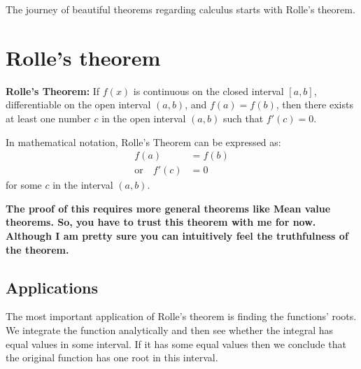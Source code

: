 The journey of beautiful theorems regarding calculus starts with Rolle's theorem. 

\section{Rolle's theorem}

\textbf{Rolle's Theorem:} If $f(x)$ is continuous on the closed interval $[a, b]$, differentiable on the open interval $(a, b)$, and $f(a) = f(b)$, then there exists at least one number $c$ in the open interval $(a, b)$ such that $f'(c) = 0$.

In mathematical notation, Rolle's Theorem can be expressed as:
\begin{align*}
    f(a) &= f(b) \\
    \text{or} \quad f'(c) &= 0
\end{align*}
for some $c$ in the interval $(a, b)$.

\textbf{The proof of this requires more general theorems like Mean value theorems. So, you have to trust this theorem with me for now. Although I am pretty sure you can intuitively feel the truthfulness of the theorem.}


\subsection{Applications}

The most important application of Rolle's theorem is finding the functions' roots. We integrate the function analytically and then see whether the integral has equal values in some interval. If it has some equal values then we conclude that the original function has one root in this interval. 


